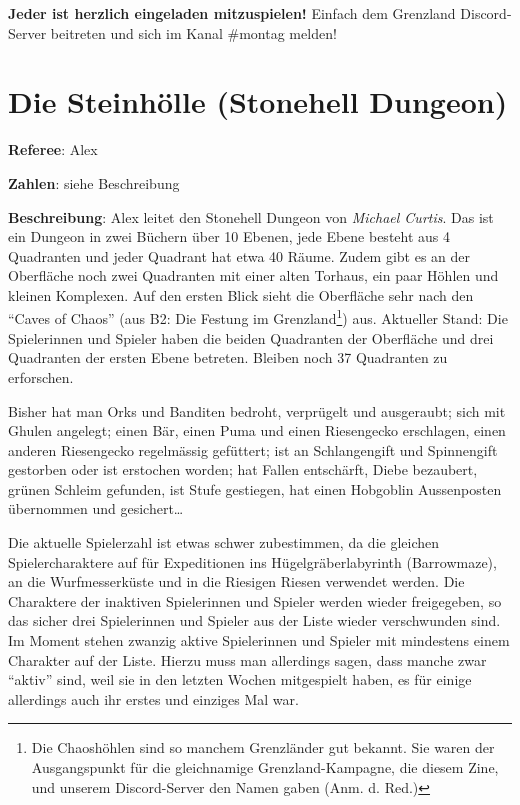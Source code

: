 \documentclass[11pt]{wbzine}
\begin{document}
\begin{multicols}{2}
\textbf{Jeder ist herzlich eingeladen mitzuspielen!} Einfach dem Grenzland
Discord-Server beitreten und sich im Kanal \#montag melden!


\section{Die Steinhölle (Stonehell Dungeon)}

\textbf{Referee}: Alex

\textbf{Zahlen}: siehe Beschreibung

    \textbf{Beschreibung}: Alex leitet den Stonehell Dungeon von
    \textit{Michael Curtis}. Das ist ein Dungeon in zwei Büchern
    über 10 Ebenen, jede Ebene besteht aus 4 Quadranten und jeder
    Quadrant hat etwa 40 Räume. Zudem gibt es an der Oberfläche noch
    zwei Quadranten mit einer alten Torhaus, ein paar Höhlen und
    kleinen Komplexen. Auf den ersten Blick sieht die Oberfläche
    sehr nach den “Caves of Chaos” (aus B2: Die Festung im
    Grenzland\footnote{Die Chaoshöhlen sind so manchem Grenzländer
    gut bekannt. Sie waren der Ausgangspunkt für die gleichnamige
    Grenzland-Kampagne, die diesem Zine, und unserem Discord-Server
    den Namen gaben (Anm. d. Red.)}) aus. Aktueller Stand: Die
    Spielerinnen und Spieler haben die beiden Quadranten der
    Oberfläche und drei Quadranten der ersten Ebene betreten.
    Bleiben noch 37 Quadranten zu erforschen.

    Bisher hat man Orks und Banditen bedroht, verprügelt und
    ausgeraubt; sich mit Ghulen angelegt; einen Bär, einen Puma und
    einen Riesengecko erschlagen, einen anderen Riesengecko
    regelmässig gefüttert; ist an Schlangengift und Spinnengift
    gestorben oder ist erstochen worden; hat Fallen entschärft,
    Diebe bezaubert, grünen Schleim gefunden, ist Stufe gestiegen,
    hat einen Hobgoblin Aussenposten übernommen und gesichert…

    Die aktuelle Spielerzahl ist etwas schwer zubestimmen, da die
    gleichen Spielercharaktere auf für Expeditionen ins
    Hügelgräberlabyrinth (Barrowmaze), an die Wurfmesserküste und in
    die Riesigen Riesen verwendet werden. Die Charaktere der
    inaktiven Spielerinnen und Spieler werden wieder freigegeben, so
    das sicher drei Spielerinnen und Spieler aus der Liste wieder
    verschwunden sind. Im Moment stehen zwanzig aktive Spielerinnen
    und Spieler mit mindestens einem Charakter auf der Liste. Hierzu
    muss man allerdings sagen, dass manche zwar “aktiv” sind, weil sie in
    den letzten Wochen mitgespielt haben, es für einige allerdings
    auch ihr erstes und einziges Mal war.



\end{multicols}
\end{document}
